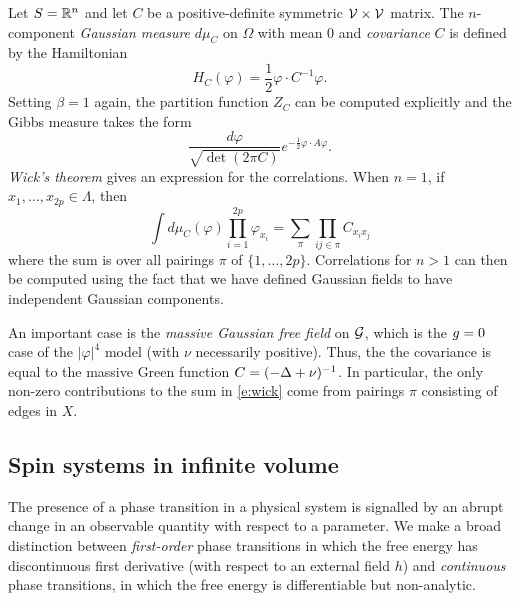 \begin{example}
Let $S = {\mathbb R}^n$ and let $C$ be a positive-definite symmetric $\mathcal{V}\times\mathcal{V}$
matrix. The $n$-component \emph{Gaussian measure} $d\mu_C$ on
$\Omega$ with mean $0$ and \emph{covariance} $C$ is defined by the Hamiltonian
\begin{equation}
H_C(\varphi) = \frac{1}{2} \varphi \cdot C^{-1} \varphi.
\end{equation}
Setting $\beta = 1$ again, the partition function $Z_C$ can be computed explicitly
and the Gibbs measure takes the form
\begin{equation}
\label{e:gauss-density}
\frac{d\varphi}{\sqrt{\det(2\pi C)}}
e^{-\tfrac12 \varphi \cdot A \varphi}.
\end{equation}
\emph{Wick's theorem} gives an expression for the correlations. When $n = 1$,
if $x_1, \ldots, x_{2p} \in \Lambda$, then
\begin{equation}
\label{e:wick}
\int d\mu_C(\varphi) \prod_{i=1}^{2p} \varphi_{x_i}
	=
\sum_\pi \prod_{ij\in\pi} C_{x_ix_j}
\end{equation}
where the sum is over all pairings $\pi$ of $\{1,\ldots,2p\}$.
Correlations for $n > 1$ can then be computed using the fact that we have defined
Gaussian fields to have independent Gaussian components.

An important case is the \emph{massive Gaussian free field} on $\mathcal{G}$,
which is the $g = 0$ case of the $|\varphi|^4$ model (with $\nu$ necessarily positive).
Thus, the the covariance is equal to the massive Green function $C = (-\Delta + \nu)^{-1}$.
In particular, the only non-zero contributions to the sum in \eqref{e:wick}
come from pairings $\pi$ consisting of edges in $X$.
\end{example}


\subsection{Spin systems in infinite volume}

The presence of a phase transition in a physical system is signalled by an abrupt
change in an observable quantity with respect to a parameter.
We make a broad distinction between
\emph{first-order} phase transitions in which the free energy has discontinuous first
derivative (with respect to an external field $h$) and \emph{continuous} phase transitions,
in which the free energy is differentiable but non-analytic.

